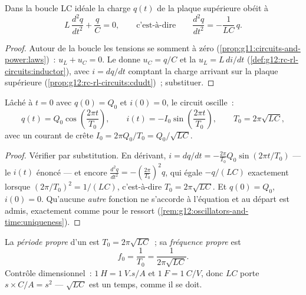 \begin{proposition}[L'équation LC]\label{prop:g12:rlc-oscillations:equation}
Dans la boucle LC idéale la charge $q(t)$ de la plaque supérieure
obéit à
\[
L\,\frac{d^2q}{dt^2} + \frac{q}{C} = 0,
\qquad\text{c'est-à-dire}\qquad
\frac{d^2q}{dt^2} = -\frac{1}{LC}\,q .
\]
\end{proposition}

\begin{proof}
Autour de la boucle les tensions se somment à zéro
(\cref{prop:g11:circuits-and-power:laws})~: $u_L + u_C = 0$. Le
 donne $u_C = q/C$ et la
 $u_L = L\,di/dt$
(\cref{def:g12:rc-rl-circuits:inductor}), avec $i = dq/dt$ comptant la
charge arrivant sur la plaque supérieure
(\cref{prop:g12:rc-rl-circuits:cdudt})~; substituer.
\end{proof}

\begin{theorem}\label{thm:g12:rlc-oscillations:oscillation}
Lâché à $t = 0$ avec $q(0) = Q_0$ et $i(0) = 0$, le circuit oscille~:
\[
q(t) = Q_0 \cos\!\left(\frac{2\pi t}{T_0}\right),
\qquad
i(t) = -I_0 \sin\!\left(\frac{2\pi t}{T_0}\right),
\qquad
T_0 = 2\pi\sqrt{LC},
\]
avec un courant de crête $I_0 = 2\pi Q_0/T_0 = Q_0/\sqrt{LC}$.
\end{theorem}

\begin{proof}
Vérifier par substitution. En dérivant,
$i = dq/dt = -\frac{2\pi}{T_0} Q_0 \sin(2\pi t/T_0)$ --- le $i(t)$
énoncé --- et encore $\frac{d^2q}{dt^2} = -(\frac{2\pi}{T_0})^2 q$,
qui égale $-q/(LC)$ exactement lorsque $(2\pi/T_0)^2 = 1/(LC)$,
c'est-à-dire $T_0 = 2\pi\sqrt{LC}$. Et $q(0) = Q_0$, $i(0) = 0$.
Qu'aucune \emph{autre} fonction ne s'accorde à l'équation et au départ
est admis, exactement comme pour le ressort
(\cref{rem:g12:oscillators-and-time:uniqueness}).
\end{proof}

\begin{definition}\label{def:g12:rlc-oscillations:period}
La \emph{période propre} d'un
 est $T_0 = 2\pi\sqrt{LC}$~; sa
\emph{fréquence propre} est
\[
f_0 = \frac{1}{T_0} = \frac{1}{2\pi\sqrt{LC}} .
\]
Contrôle dimensionnel~: $\qty{1}{H} = \qty{1}{V.s/A}$ et
$\qty{1}{F} = \qty{1}{C/V}$, donc $LC$ porte
$\unit{s} \times \unit{C/A} = \unit{s^2}$ --- $\sqrt{LC}$ est un
temps, comme il se doit.
\end{definition}

